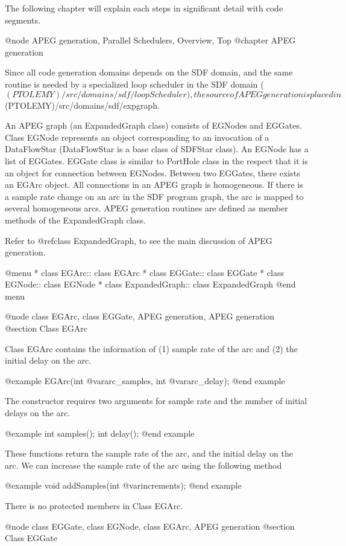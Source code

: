 The following chapter will explain each steps in significant detail with
code segments.
 
@node APEG generation, Parallel Schedulers, Overview, Top
@chapter APEG generation

Since all code generation domains depends on the SDF domain, and 
the same routine is needed by a specialized loop scheduler in the SDF
domain ($(PTOLEMY)/src/domains/sdf/loopScheduler), the source of APEG 
generation is placed in $(PTOLEMY)/src/domains/sdf/expgraph.

An APEG graph (an ExpandedGraph class) consists of EGNodes and 
EGGates. Class EGNode represents
an object corresponding to an invocation of a DataFlowStar (DataFlowStar
is a base class of SDFStar class). An EGNode has a list of EGGates.
EGGate class is similar to PortHole class in the respect that it
is an object for connection between EGNodes. Between two EGGates,
there exists an EGArc object. All connections in an APEG
graph is homogeneous. If there is a sample rate change on an arc in the
SDF program graph, the arc is mapped to several homogeneous arcs.
APEG generation routines are defined as member methods of the ExpandedGraph
class.

Refer to @ref{class ExpandedGraph}, to see the main discussion of APEG
generation.

@menu
* class EGArc::			class EGArc
* class EGGate::		class EGGate
* class EGNode::		class EGNode
* class ExpandedGraph::		class ExpandedGraph
@end menu

@node class EGArc, class EGGate, APEG generation, APEG generation
@section Class EGArc

Class EGArc contains the information of (1) sample rate
of the arc and (2) the initial delay on the arc.

@example
EGArc(int @var{arc_samples}, int @var{arc_delay});
@end example

The constructor requires two arguments for sample rate and the
number of initial delays on the arc.

@example
int samples();
int delay();
@end example

These functions return the sample rate of the arc, and the
initial delay on the arc. We can increase the sample rate of the
arc using the following method

@example
void addSamples(int @var{increments});
@end example

There is no protected members in Class EGArc.

@node class EGGate, class EGNode, class EGArc, APEG generation
@section Class EGGate

